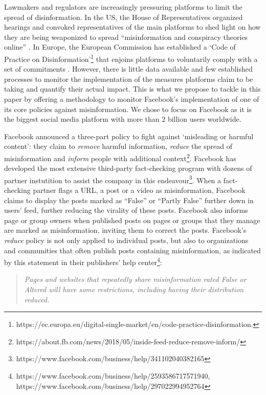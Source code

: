 \documentclass[11pt,a4paper]{article}
\begin{document}
Lawmakers and regulators are increasingly pressuring platforms to limit the spread of disinformation. 
In the US, the House of Representatives organized hearings and convoked representatives of the main platforms to shed light on how they are being weaponized to spread ``misinformation and conspiracy theories online'' \citep{donovan2020}. 
In Europe, the European Commission has established a `Code of Practice on Disinformation'\footnote{https://ec.europa.eu/digital-single-market/en/code-practice-disinformation.} that enjoins platforms to voluntarily comply with a set of commitments \citep{heldt2019let}. 
However, there is little data available and few established processes to monitor the implementation of the measures platforms claim to be taking and quantify their actual impact. 
This is what we propose to tackle in this paper by offering a methodology to monitor Facebook’s implementation of one of its core policies against misinformation. 
We chose to focus on Facebook as it is the biggest social media platform with more than 2 billion users worldwide.

Facebook announced a three-part policy to fight against ‘misleading or harmful content’: they claim to \textit{remove} harmful information, \textit{reduce} the spread of misinformation and \textit{inform} people with additional context\footnote{https://about.fb.com/news/2018/05/inside-feed-reduce-remove-inform/}. 
Facebook has developed the most extensive third-party fact-checking program with dozens of partner instutition to assist the company in this endeavour\footnote{https://www.facebook.com/business/help/341102040382165}. 
When a fact-checking partner flags a URL, a post or a video as misinformation, Facebook claims to display the posts marked as “False” or “Partly False” further down in users’ feed, further reducing the virality of these posts. 
Facebook also informs page or group owners when published posts on pages or groups that they manage are marked as misinformation, inviting them to correct the posts. 
Facebook’s \textit{reduce} policy is not only applied to individual posts, but also to organizations and communities that often publish posts containing misinformation, as indicated by this statement in their publishers’ help center\footnote{https://www.facebook.com/business/help/2593586717571940, https://www.facebook.com/business/help/297022994952764}: 
\begin{quote}
\emph{Pages and websites that repeatedly share misinformation rated False or Altered will have some restrictions, including having their distribution reduced.}
\end{quote}
\end{document}
